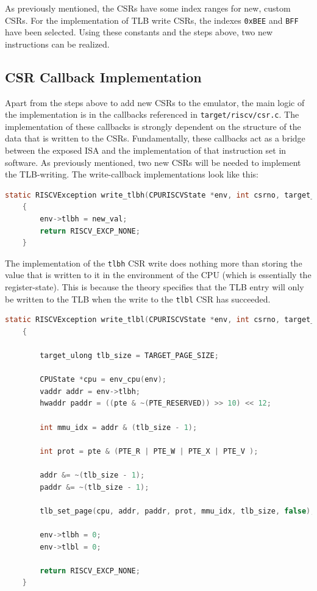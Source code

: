 As previously mentioned, the CSRs have some index ranges for new, custom CSRs. For the implementation
of TLB write CSRs, the indexes \texttt{0xBEE} and \texttt{BFF} have been selected.
Using these constants and the steps above, two new instructions can be realized.

\subsection{CSR Callback Implementation} Apart from the steps above to add new CSRs to the emulator, the
main logic of the implementation is in the callbacks referenced in \texttt{target/riscv/csr.c}.
The implementation of these callbacks is strongly dependent on the structure of the data that is written to
the CSRs. Fundamentally, these callbacks act as a bridge between the exposed ISA and the implementation of
that instruction set in software.
As previously mentioned, two new CSRs will be needed to implement the TLB-writing.
The write-callback implementations look like this:



\begin{lstlisting}[language=c,float=h!,basicstyle=\footnotesize,caption={\textbf{Implementation of the tlbh Write Function}}
    label={lst:tlbh}]
    static RISCVException write_tlbh(CPURISCVState *env, int csrno, target_ulong new_val)
    {
        env->tlbh = new_val;
        return RISCV_EXCP_NONE;
    }
\end{lstlisting}
The implementation of the \texttt{tlbh} CSR write does nothing more than storing the value
that is written to it in the environment of the CPU (which is essentially the register-state).
This is because the theory specifies that the TLB entry will only
be written to the TLB when the write to the \texttt{tlbl} CSR has succeeded.

\begin{lstlisting}[language=c,float=h!,basicstyle=\footnotesize,caption={\textbf{Implementation of tlbl write function}}
    label={lst:tlbl}]
    static RISCVException write_tlbl(CPURISCVState *env, int csrno, target_ulong pte)
    {

        target_ulong tlb_size = TARGET_PAGE_SIZE;

        CPUState *cpu = env_cpu(env);
        vaddr addr = env->tlbh;
        hwaddr paddr = ((pte & ~(PTE_RESERVED)) >> 10) << 12;

        int mmu_idx = addr & (tlb_size - 1);

        int prot = pte & (PTE_R | PTE_W | PTE_X | PTE_V );

        addr &= ~(tlb_size - 1);
        paddr &= ~(tlb_size - 1);

        tlb_set_page(cpu, addr, paddr, prot, mmu_idx, tlb_size, false);

        env->tlbh = 0;
        env->tlbl = 0;

        return RISCV_EXCP_NONE;
    }
\end{lstlisting}

